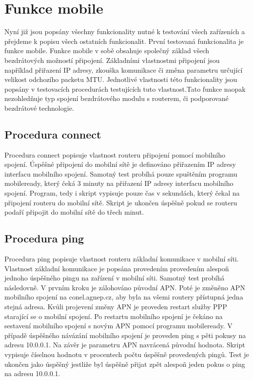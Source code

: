 \section{Funkce mobile}
Nyní již jsou popsány všechny funkcionality nutné k testování všech zařízeních a přejdeme k popisu všech ostatních funkcionalit. První testovaná funkcionalita je funkce mobile. Funkce mobile v sobě obsahuje společný základ všech bezdrátových možností připojení. Základními vlastnostmi připojení jsou například přiřazení IP adresy, zkouška komunikace či změna parametru určující velikost odchozího packetu MTU. Jednotlivé vlastnosti této funkcionality jsou popsány v testovacích procedurách testujících tuto vlastnost.Tato funkce naopak nezohledňuje typ spojení bezdrátového modulu s routerem, či podporované bezdrátové technologie.

\subsection{Procedura connect}
Procedura connect popisuje vlastnost routeru připojení pomocí mobilního spojení. Úspěšné připojení do mobilní sítě je definováno přiřazením IP adresy interfacu mobilního spojení. Samotný test probíhá pouze spuštěním programu mobileready, který čeká 3 minuty na přiřazení IP adresy interfacu mobilního spojení. Program, tedy i skript vypisuje pouze čas v sekundách, který čekal na připojení routeru do mobilní sítě. Skript je ukončen úspěšně pokud se routeru podaří připojit do mobilní sítě do třech minut.

\subsection{Procedura ping}
Procedura ping popisuje vlastnost routeru základní komunikace v mobilní síti. Vlastnost základní komunikace je popsána provedením provedením alespoň jednoho úspěšného pingu na zařízení v mobilní síti. Samotný test probíhá následovně. V prvním kroku je zálohováno původní APN. Poté je změněno APN mobilního spojení na conel.agnep.cz, aby byla na všemi routery přístupná jedna stejná adresa. Kvůli projevení změny APN je proveden restart služby PPP starající se o mobilní spojení. Po restartu mobilního spojení je čekáno na sestavení mobilního spojení s novým APN pomocí programu mobileready. V případě úspěšného návázání mobilního spojení je proveden ping s pěti pokusy na adresu 10.0.0.1. Na závěr je parametru APN navrácená původní hodnota. Skript vypisuje číselnou hodnotu v procentech počtu úspěšně provedených pingů. Test je ukončen jako úspěšný jestliže byl úspěšně přijat zpět alespoň jeden pokus o ping na adresu 10.0.0.1.

